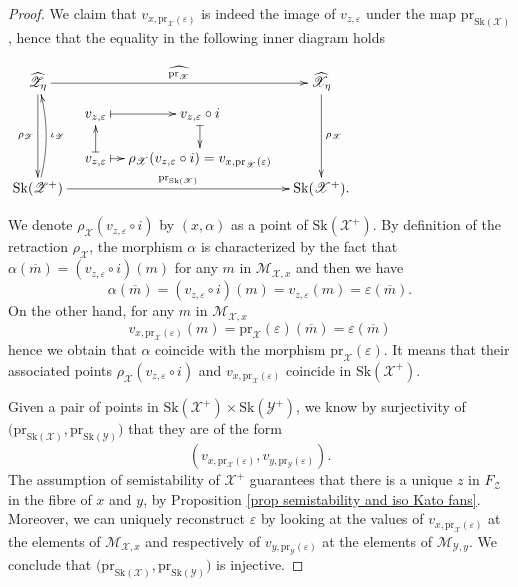 \documentclass{amsart}%
\numberwithin{equation}{subsection}
\theoremstyle{plain2}
\theoremstyle{definition2}
\theoremstyle{stepstyle}
\theoremstyle{point}
\theoremstyle{subpoint}
\newcommand{\cX}{\ensuremath{\mathscr{X}}}
\newcommand{\caM}{\ensuremath{\mathcal{M}}}
\newcommand{\cY}{\ensuremath{\mathscr{Y}}}
\newcommand{\cZ}{\ensuremath{\mathscr{Z}}}
\renewcommand{\cZ}{\ensuremath{\mathscr{Z}}}
\renewcommand{\cY}{\ensuremath{\mathscr{Y}}}
\newcommand{\pr}{\mathrm{pr}}
\newcommand{\Sk}{\mathrm{Sk}}
\begin{document}
\begin{proof}
We claim that $v_{x, \pr_{\cX}(\varepsilon)}$ is indeed the image of $v_{z,\varepsilon}$ under the map $\pr_{\Sk(\cX)}$, hence that the equality in the following inner diagram holds
\begin{center} 
$\begin{gathered}
\xymatrixcolsep{0.8pc}\xymatrixrowsep{0.4pc} \xymatrix{
 \widehat{\cZ_{\eta}} \ar[rrr]^-{\widehat{\pr_{\cX}}} \ar[dddd]_{\rho_\cZ} & & & \widehat{\cX_{\eta}}\ar[dddd]^{\rho_\cX}\\
 \footnotesize & v_{z,\varepsilon} \ar@{|->}[r] &  v_{z,\varepsilon} \circ i\ar@{|->}[dd] & \\
 & & & \\
 & v_{z,\varepsilon} \ar@{|->}[uu] \ar@{|->}[r] & \rho_\cX(v_{z,\varepsilon} \circ i) = v_{x, \pr_{\cX}(\varepsilon)}& \\
 \normalsize \Sk(\cZ^+) \ar[rrr]^-{\pr_{\Sk(\cX)}} \ar@/_/[uuuu]_-{\iota_\cZ}  & & & \Sk(\cX^+).
}
\end{gathered}$\end{center} We denote $\rho_\cX(v_{z,\varepsilon} \circ i)$ by $(x,\alpha)$ as a point of $\Sk(\cX^+)$. By definition of the retraction $\rho_\cX$, the morphism $\alpha$ is characterized by the fact that $\alpha(\overline{m})= (v_{z,\varepsilon} \circ i )(m)$ for any $m$ in $\caM_{\cX,x}$ and then we have $$\alpha(\overline{m})= (v_{z,\varepsilon} \circ i )(m) = v_{z,\varepsilon}(m)= \varepsilon(\overline{m}).$$ On the other hand, for any $m$ in $\caM_{\cX,x}$ $$v_{x,\pr_{\cX}(\varepsilon)}(m)= \pr_{\cX}(\varepsilon) (\overline{m}) = \varepsilon(\overline{m})$$ hence we obtain that $\alpha$ coincide with the morphism $\pr_{\cX}(\varepsilon)$. It means that their associated points $\rho_\cX(v_{z,\varepsilon} \circ i)$ and $v_{x, \pr_{\cX}(\varepsilon)}$ coincide in $\Sk(\cX^+)$.

Given a pair of points in $\Sk(\cX^+) \times \Sk(\cY^+)$, we know by surjectivity of $\big(\pr_{\Sk(\cX)}, \pr_{\Sk(\cY)}\big)$  that they are of the form $$(v_{x, \pr_{\cX}(\varepsilon)}, v_{y, \pr_{\cY}(\varepsilon)}).$$ The assumption of semistability of $\cX^+$ guarantees that there is a unique $z$ in $F_\cZ$ in the fibre of $x$ and $y$, by Proposition \ref{prop semistability and iso Kato fans}. Moreover, we can uniquely reconstruct $\varepsilon$ by looking at the values of $v_{x, \pr_{\cX}(\varepsilon)}$ at the elements of $\caM_{\cX,x}$ and respectively of $v_{y, \pr_{\cY}(\varepsilon)}$ at the elements of $\caM_{\cY,y}$. We conclude that $\big(\pr_{\Sk(\cX)}, \pr_{\Sk(\cY)}\big)$  is injective.
\end{proof}
\end{document}
